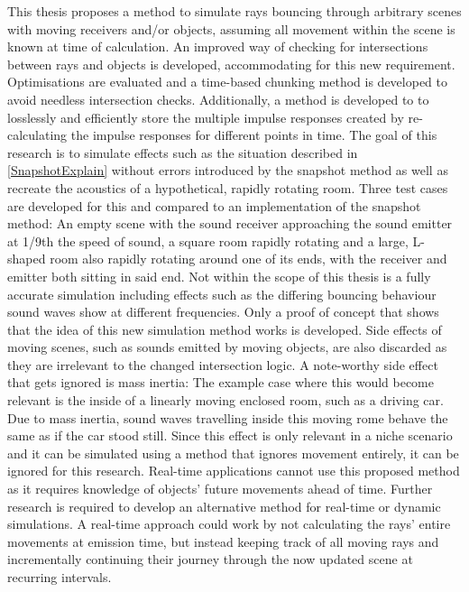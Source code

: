 This thesis proposes a method to simulate rays bouncing through arbitrary scenes with moving receivers and/or objects,
assuming all movement within the scene is known at time of calculation.
An improved way of checking for intersections between rays and objects is developed, accommodating for this new requirement.
Optimisations are evaluated and a time-based chunking method is developed to avoid needless intersection checks.
Additionally, a method is developed to to losslessly and efficiently store the multiple impulse responses created by re-calculating
the impulse responses for different points in time.
The goal of this research is to simulate effects such as the situation described in \ref{SnapshotExplain} without errors introduced by the snapshot method
as well as recreate the acoustics of a hypothetical, rapidly rotating room.
Three test cases are developed for this and compared to an implementation of the snapshot method:
An empty scene with the sound receiver approaching the sound emitter at 1/9th the speed of sound,
a square room rapidly rotating
and a large, L-shaped room also rapidly rotating around one of its ends, with the receiver and emitter both sitting in said end.
\newline
Not within the scope of this thesis is a fully accurate simulation
including effects such as the differing bouncing behaviour sound waves show at different frequencies.
Only a proof of concept that shows that the idea of this new simulation method works is developed.
\newline
Side effects of moving scenes, such as sounds emitted by moving objects, are also discarded as they are irrelevant to
the changed intersection logic.
A note-worthy side effect that gets ignored is mass inertia:
The example case where this would become relevant is the inside of a linearly moving enclosed room, such as a driving car.
Due to mass inertia, sound waves travelling inside this moving rome behave the same as if the car stood still.
Since this effect is only relevant in a niche scenario and it can be simulated using a method that ignores movement entirely,
it can be ignored for this research.
\newline
Real-time applications cannot use this proposed method as it requires knowledge of objects' future movements ahead of time.
Further research is required to develop an alternative method for real-time or dynamic simulations.
A real-time approach could work by not calculating the rays' entire movements at emission time,
but instead keeping track of all moving rays and incrementally continuing their journey through the now updated scene
at recurring intervals.
